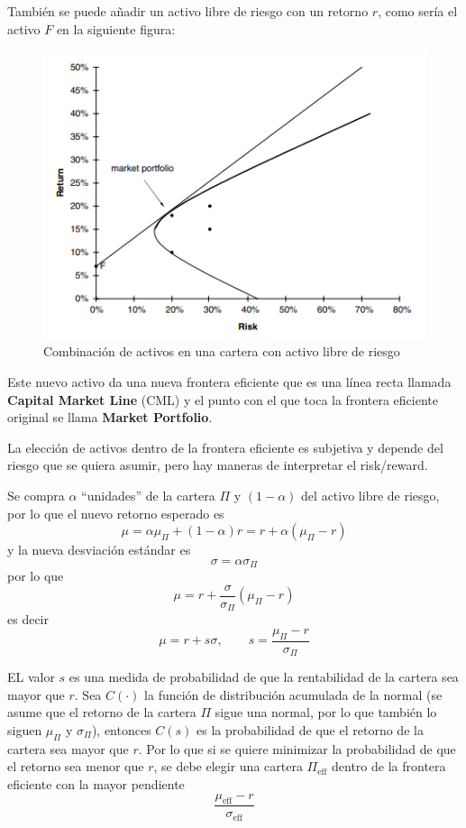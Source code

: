 También se puede añadir un activo libre de riesgo con un retorno $r$, como sería el activo $F$ en la siguiente figura:
\begin{figure}[H]
    \centering
    \includegraphics[width=0.65\linewidth]{Imagenes/14_Gestion_carteras/Combinacion_activos_Free_Risk.png}
    \caption{Combinación de activos en una cartera con activo libre de riesgo}
    \label{fig:cartera_free_risk}
\end{figure}
Este nuevo activo da una nueva frontera eficiente que es una línea recta llamada \textbf{Capital Market Line} (CML) y el punto con el que toca la frontera eficiente original se llama \textbf{Market Portfolio}.




La elección de activos dentro de la frontera eficiente es subjetiva y depende del riesgo que se quiera asumir, pero hay maneras de interpretar el risk/reward. 

Se compra $\alpha$ ``unidades'' de la cartera $\Pi$ y $(1-\alpha)$ del activo libre de riesgo, por lo que el nuevo retorno esperado es
\[
    \mu = \alpha \mu_{\Pi} + (1 - \alpha) r = r + \alpha \left( \mu_{\Pi} - r \right)
\]
y la nueva desviación estándar es
\[
    \sigma = \alpha \sigma_{\Pi}
\]
por lo que
\[
    \mu = r + \frac{\sigma}{\sigma_{\Pi}} \left( \mu_{\Pi} - r \right)
\]
es decir
\[
    \mu = r + s \sigma, \qquad \boxed{s = \frac{\mu_{\Pi} - r}{\sigma_{\Pi}}}
\]

EL valor $s$ es una medida de probabilidad de que la rentabilidad de la cartera sea mayor que $r$. Sea $C(\cdot)$ la función de distribución acumulada de la normal (se asume que el retorno de la cartera $\Pi$ sigue una normal, por lo que también lo siguen $\mu_{\Pi}$ y $\sigma_{\Pi}$), entonces $C(s)$ es la probabilidad de que el retorno de la cartera sea mayor que $r$. Por lo que si se quiere minimizar la probabilidad de que el retorno sea menor que $r$, se debe elegir una cartera $\Pi_{\text{eff}}$ dentro de la frontera eficiente con la mayor pendiente
\[
    \frac{\mu_{\text{eff}} -  r}{\sigma_{\text{eff}}}
\]

